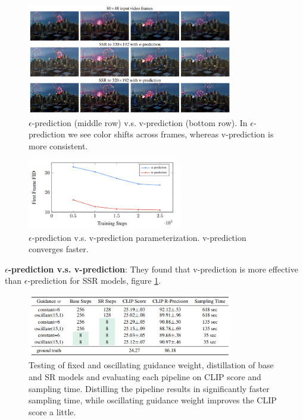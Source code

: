 \begin{figure}
    \centering
    \includegraphics[width=0.8\textwidth]{images/imagen_video/e_prediction_vs_v_prediction.png}
    \caption{$\epsilon$-prediction (middle row) v.s. v-prediction (bottom row). In $\epsilon$-prediction we see color shifts across frames, whereas v-prediction is more consistent.}
    \label{fig:imagen_video_epsilon_prediction_vs_v_prediction}
\end{figure}

\begin{figure}
    \centering
    \includegraphics[width=0.6\textwidth]{images/imagen_video/e_prediction_vs_v_prediction_2.png}
    \caption{$\epsilon$-prediction v.s. v-prediction parameterization. v-prediction converges faster.}
\end{figure}

\textbf{$\epsilon$-prediction v.s. v-prediction}: They found that v-prediction is more effective than $\epsilon$-prediction for SSR models, figure \ref{fig:imagen_video_epsilon_prediction_vs_v_prediction}.

\begin{figure}
    \centering
    \includegraphics[width=0.8\textwidth]{images/imagen_video/experiments_table.png}
    \caption{Testing of fixed and oscillating guidance weight, distillation of base and SR models and evaluating each pipeline on CLIP score and sampling time. Distilling the pipeline results in significantly faster sampling time, while oscillating guidance weight improves the CLIP score a little.}
    \label{fig:imagen_video_experiments_table}
\end{figure}

